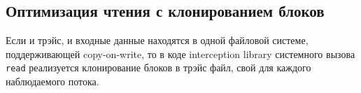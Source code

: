 \subsection{Оптимизация чтения с клонированием блоков}

Если и трэйс, и входные данные находятся в одной файловой системе, поддерживающей copy-on-write, то в коде interception library 
системного вызова \texttt{read} реализуется клонирование блоков в трэйс файл, свой для каждого наблюдаемого потока.

